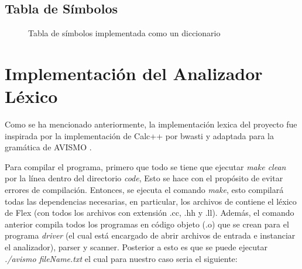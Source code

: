 \subsection{Tabla de Símbolos}

\begin{figure}[H]
    \label{fig: tablaDeSimbolos}
    \caption{Tabla de símbolos implementada como un diccionario}
\end{figure}

\section{Implementación del Analizador Léxico}


Como se ha mencionado anteriormente, la implementación lexica del proyecto fue inspirada por la implementación de Calc++ por bwasti y adaptada para la gramática de AVISMO \cite{wasti_bwastibison-example-calc-_2020}. 

Para compilar el programa, primero que todo se tiene que ejecutar \textit{make clean} por la línea dentro del directorio \textit{code}, Esto se hace con el propósito de evitar errores de compilación.
Entonces, se ejecuta el comando \textit{make}, esto compilará todas las dependencias necesarias, en particular, los archivos de contiene el léxico de Flex (con todos los archivos con extensión .cc, .hh y .ll).
Además, el comando anterior compila todos los programas en código objeto (.o) que se crean para el programa \textit{driver} (el cual está encargado de abrir archivos de entrada e instanciar el analizador), parser y scanner.
Posterior a esto es que se puede ejecutar \textit{./avismo fileName.txt} el cual para nuestro caso seria el siguiente: 

